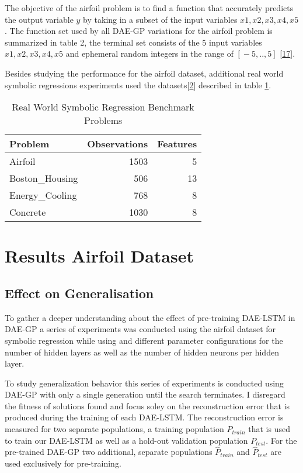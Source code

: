 \documentclass[
  11pt,
]{article}
\begin{document}
The objective of the airfoil problem is to find a function that accurately predicts the output variable \(y\) by taking in a subset of the input variables \(x1,x2,x3,x4,x5\). The function set used by all DAE-GP variations for the airfoil problem is summarized in table 2, the terminal set consists of the 5 input variables \(x1,x2,x3,x4,x5\) and ephemeral random integers in the range of \([{}-5,..,5]\) {[}\protect\hyperlink{ref-dae-gp_2022_symreg}{17}{]}.

Besides studying the performance for the airfoil dataset, additional real world symbolic regressions experiments used the datasets{[}\protect\hyperlink{ref-machine_learning_repo}{2}{]} described in table \ref{tab:full-run-realWorldSymReg-problems}.

\begin{table}[!h]

\caption{\label{tab:full-run-realWorldSymReg-problems}Real World Symbolic Regression Benchmark Problems}
\centering
\begin{tabular}[t]{l|r|r}
\hline
\textbf{Problem} & \textbf{Observations} & \textbf{Features}\\
\hline
Airfoil & 1503 & 5\\
\hline
Boston\_Housing & 506 & 13\\
\hline
Energy\_Cooling & 768 & 8\\
\hline
Concrete & 1030 & 8\\
\hline
\end{tabular}
\end{table}

\hypertarget{results-airfoil-dataset}{%
\section{Results Airfoil Dataset}\label{results-airfoil-dataset}}

\hypertarget{effect-on-generalisation}{%
\subsection{Effect on Generalisation}\label{effect-on-generalisation}}

To gather a deeper understanding about the effect of pre-training DAE-LSTM in DAE-GP a series of experiments was conducted using the airfoil dataset for symbolic regression while using and different parameter configurations for the number of hidden layers as well as the number of hidden neurons per hidden layer.

To study generalization behavior this series of experiments is conducted using DAE-GP with only a single generation until the search terminates. I disregard the fitness of solutions found and focus soley on the reconstruction error that is produced during the training of each DAE-LSTM. The reconstruction error is measured for two separate populations, a training population \(P_{train}\) that is used to train our DAE-LSTM as well as a hold-out validation population \(P_{test}\). For the pre-trained DAE-GP two additional, separate populations \(\hat{P}_{train}\) and \(\hat{P}_{test}\) are used exclusively for pre-training.
\end{document}
